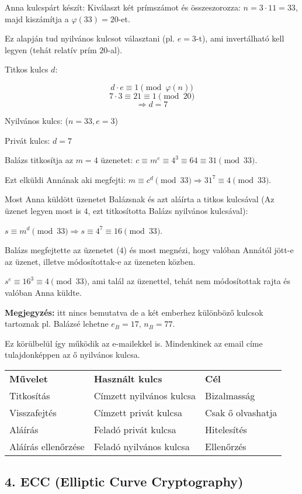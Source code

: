 \begin{example}
Anna kulcspárt készít: Kiválaszt két prímszámot és összeszorozza:
$n=3\cdot11=33$, majd kiszámítja a $\varphi(33)=20$-et.

Ez alapján tud nyilvános kulcsot választani (pl. $e=3$-t), ami invertálható
kell legyen (tehát relatív prím $20$-al).

Titkos kulcs $d$:

\[
d\cdot e\equiv1\pmod{\varphi(n)}
\]
\[
7\cdot3\equiv21\equiv1\pmod{20}
\]
\[
\Rightarrow d=7
\]

Nyilvános kulcs: ($n=33,e=3$)

Privát kulcs: $d=7$

Balázs titkosítja az $m=4$ üzenetet: $c\equiv m^{e}\equiv4^{3}\equiv64\equiv31\pmod{33}$.

Ezt elküldi Annának aki megfejti: $m\equiv c^{d}\pmod{33}\Rightarrow31^{7}\equiv4\pmod{33}$.
\vspace*{1em}

Most Anna küldött üzenetet Balázsnak és azt aláírta a titkos kulcsával
(Az üzenet legyen most is $4$, ezt titkosította Balázs nyilvános
kulcsával):

$s\equiv m^{d}\pmod{33}\Rightarrow s\equiv4^{7}\equiv16\pmod{33}$.

Balázs megfejtette az üzenetet ($4$) és most megnézi, hogy valóban
Annától jött-e az üzenet, illetve módosítottak-e az üzeneten közben.

$s^{e}\equiv16^{3}\equiv4\pmod{33}$, ami talál az üzenettel, tehát
nem módosítottak rajta és valóban Anna küldte.
\end{example}
\textbf{Megjegyzés:} itt nincs bemutatva de a két emberhez különböző
kulcsok tartoznak pl. Balázsé lehetne $e_{B}=17,\,n_{B}=77$. \vspace{1em}

Ez körülbelül így működik az e-mailekkel is. Mindenkinek az email
címe tulajdonképpen az ő nyilvános kulcsa.

\begin{tabular}{lll}
\textbf{Művelet}  & \textbf{Használt kulcs}  & \textbf{Cél} \tabularnewline
Titkosítás  & Címzett nyilvános kulcsa  & Bizalmasság \tabularnewline
Visszafejtés  & Címzett privát kulcsa  & Csak ő olvashatja \tabularnewline
Aláírás  & Feladó privát kulcsa  & Hitelesítés \tabularnewline
Aláírás ellenőrzése  & Feladó nyilvános kulcsa  & Ellenőrzés\tabularnewline
\end{tabular}

\subsection*{4. ECC (Elliptic Curve Cryptography)}

